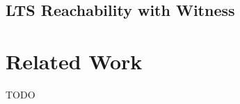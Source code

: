 \documentclass[10pt,conference]{IEEEtran}
\begin{document}
\subsection{LTS Reachability with Witness}



\section{Related Work}
TODO

%
%

\end{document}
